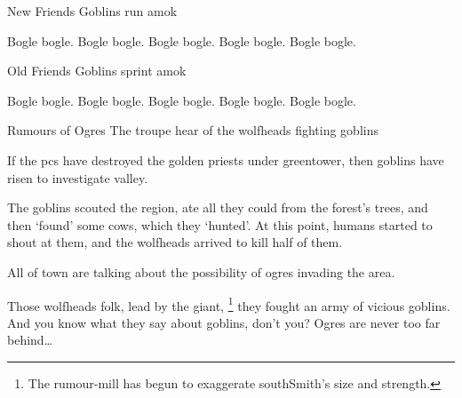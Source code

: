\label{goblinsEmerge}



\togglefalse{firstsq}
{New Friends}%
{Goblins run amok}%

Bogle bogle.
Bogle bogle.
Bogle bogle.
Bogle bogle.
Bogle bogle.

\togglefalse{firstsq}
{Old Friends}%
{Goblins sprint amok}%

Bogle bogle.
Bogle bogle.
Bogle bogle.
Bogle bogle.
Bogle bogle.


{\squash Rumours of Ogres}%
{The troupe hear of the \glspl{wolfhead} fighting goblins}%

If the \glspl{pc} have destroyed the golden priests under \gls{greentower}, then goblins have risen to investigate \gls{valley}.

\begin{exampletext}
  The goblins scouted the region, ate all they could from the forest's trees, and then `found' some cows, which they `hunted'.
  At this point, humans started to shout at them, and the \glspl{wolfhead} arrived to kill half of them.
\end{exampletext}

All of \gls{town} are talking about the possibility of ogres invading the area.

\begin{speechtext}
  Those \glspl{wolfhead} folk, lead by the giant,%
  \footnote{The rumour-mill has begun to exaggerate \gls{southSmith}'s size and strength.}
  they fought an army of vicious goblins.
  And you know what they say about goblins, don't you?
  Ogres are never too far behind\ldots
\end{speechtext}
